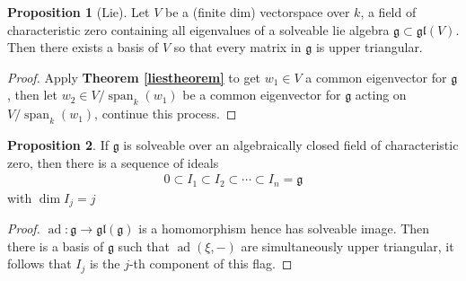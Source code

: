 \documentclass[10.5pt]{article}
\theoremstyle{definition}
\newtheorem{proposition}{Proposition}
\numberwithin{example}{subsection}
\numberwithin{proposition}{subsection}
\numberwithin{pb}{subsection}
\begin{document}
        \begin{proposition}[Lie]\label{lieuppertriang}
            Let \(V\) be a (finite dim) vectorspace over \(k\), a field of characteristic zero containing all eigenvalues of a solveable lie algebra \(\mathfrak{g} \subset \mathfrak{gl}(V)\). Then there exists a basis of \(V\) so that every matrix in \(\mathfrak{g}\) is upper triangular.

            \begin{proof}
                Apply \textbf{Theorem \ref{liestheorem}} to get \(w_1 \in V\) a common eigenvector for \(\mathfrak{g}\), then let \(w_2 \in V/\operatorname{span}_k(w_1)\) be a common eigenvector for \(\mathfrak{g}\) acting on \(V/\operatorname{span}_k(w_1)\), continue this process.
            \end{proof}
        \end{proposition}

        \begin{proposition}\label{corlieideals}
            If \(\mathfrak{g}\) is solveable over an algebraically closed field of characteristic zero, then there is a sequence of ideals
            \begin{align}
                0 \subset I_1 \subset I_2 \subset \cdots \subset I_n = \mathfrak{g}
            \end{align}
            with \(\dim I_j = j\)

            \begin{proof}
                \(\operatorname{ad}: \mathfrak{g} \to \mathfrak{gl}(\mathfrak{g})\) is a homomorphism hence has solveable image. Then there is a basis of \(\mathfrak{g}\) such that \(\operatorname{ad}(\xi,-)\) are simultaneously upper triangular, it follows that \(I_j\) is the \(j\)-th component of this flag.
            \end{proof}
        \end{proposition}
        
\end{document}
